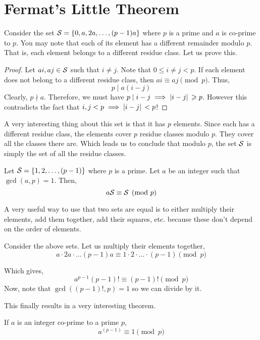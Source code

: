 \section{Fermat's Little Theorem}

Consider the set \(\mathcal{S} = \left\{0, a, 2a, \dots, (p-1)a\right\}\) where \(p\)
is a prime and \(a\) is co-prime to \(p\). You may note
that each of its element has a different remainder modulo \(p\). That is,
each element belongs to a different residue class. Let us prove this.

\begin{proof}
    Let \(ai, aj \in \mathcal{S}\) such that \(i \neq j\). Note that 
    \(0 \le i \ne j < p\). 
    If each element does not belong to a different residue class, then 
    \(ai \equiv aj \pmod{p}\). Thus, 
    \[p \mid a(i-j)\]
    Clearly, \(p \nmid a\). Therefore, we must have \(p \mid i-j \implies 
    \abs*{i-j} \geqslant p\). However this contradicts the fact 
    that \(i, j < p \implies \abs*{i-j} < p\)!
\end{proof}

A very interesting thing about this set is that it has \(p\) elements.
Since each has a different residue class, the elements cover 
\(p\) residue classes modulo \(p\). They cover all the classes there are.
Which leads us to conclude that modulo \(p\), the set \(\mathcal{S}\) is simply 
the set of all the residue classes.

\begin{lemma}
    Let \(\mathcal{S} = \left\{1, 2, \dots, (p-1)\right\}\) where \(p\) is 
    a prime. Let \(a\) be an integer such that \(\gcd(a, p) = 1\). Then,
    \[ a\mathcal{S} \equiv \mathcal{S} \pmod{p} \]
\end{lemma}

A very useful way to use that two sets are equal is to either 
multiply their elements, add them together, add their squares, etc.
because these don't depend on the order of elements.

Consider the above sets. Let us multiply their elements together,
\[a \cdot 2a \cdot \dots (p-1)a \equiv 1 \cdot 2 \cdot \dots \cdot (p-1) \pmod{p}\]

Which gives, 
\[a^{p-1}(p-1)! \equiv (p-1)! \pmod{p}\]
Now, note that \(\gcd((p-1)!, p) = 1\) so we can divide by it.

This finally results in a very interesting theorem. 

\begin{theorem}
    \label{theorem: fermatlittle}
    If \(a\) is an integer co-prime to a prime \(p\), 
    \[a^{(p-1)} \equiv 1 \pmod{p}\]
\end{theorem}


